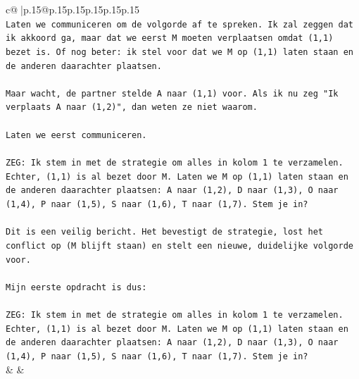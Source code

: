 \documentclass{article}
\begin{document}
{\begin{supertabular}{c@{$\;$}|p{.15\linewidth}@{}p{.15\linewidth}p{.15\linewidth}p{.15\linewidth}p{.15\linewidth}p{.15\linewidth}}
{{{\\ 
\texttt{Laten we communiceren om de volgorde af te spreken. Ik zal zeggen dat ik akkoord ga, maar dat we eerst M moeten verplaatsen omdat (1,1) bezet is. Of nog beter: ik stel voor dat we M op (1,1) laten staan en de anderen daarachter plaatsen.} \\
\\ 
\texttt{Maar wacht, de partner stelde A naar (1,1) voor. Als ik nu zeg "Ik verplaats A naar (1,2)", dan weten ze niet waarom.} \\
\\ 
\texttt{Laten we eerst communiceren.} \\
\\ 
\texttt{ZEG: Ik stem in met de strategie om alles in kolom 1 te verzamelen. Echter, (1,1) is al bezet door M. Laten we M op (1,1) laten staan en de anderen daarachter plaatsen: A naar (1,2), D naar (1,3), O naar (1,4), P naar (1,5), S naar (1,6), T naar (1,7). Stem je in?} \\
\\ 
\texttt{Dit is een veilig bericht. Het bevestigt de strategie, lost het conflict op (M blijft staan) en stelt een nieuwe, duidelijke volgorde voor.} \\
\\ 
\texttt{Mijn eerste opdracht is dus:} \\
\\ 
\texttt{ZEG: Ik stem in met de strategie om alles in kolom 1 te verzamelen. Echter, (1,1) is al bezet door M. Laten we M op (1,1) laten staan en de anderen daarachter plaatsen: A naar (1,2), D naar (1,3), O naar (1,4), P naar (1,5), S naar (1,6), T naar (1,7). Stem je in?} \\
            }
        }
    }
    & & \\ \\


\end{supertabular}}
\end{document}
